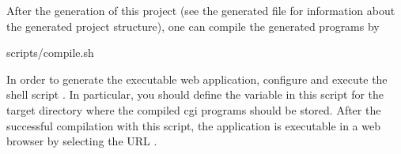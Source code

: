 After the generation of this project (see the generated file
 for information about the generated project structure),
one can compile the generated programs by
\begin{curry}
scripts/compile.sh
\end{curry}
In order to generate the executable web application,
configure and execute the shell script .
In particular, you should define the variable
 in this script for the target directory
where the compiled cgi programs should be stored.
After the successful compilation with this script,
the application is executable
in a web browser by selecting the URL .

